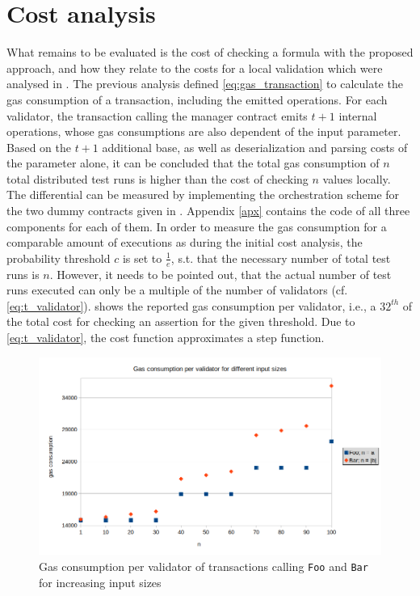 \section{Cost analysis}\label{sec:cost_analysis_distributed}
What remains to be evaluated is the cost of checking a formula with the proposed approach, and how they relate to the costs for a local validation which were analysed in . The previous analysis defined \eqref{eq:gas_transaction} to calculate the gas consumption of a transaction, including the emitted operations. For each validator, the transaction calling the manager contract emits $t+1$ internal operations, whose gas consumptions are also dependent of the input parameter. Based on the $t+1$ additional base, as well as deserialization and parsing costs of the parameter alone, it can be concluded that the total gas consumption of $n$ total distributed test runs is higher than the cost of checking $n$ values locally. \\
The differential can be measured by implementing the orchestration scheme for the two dummy contracts given in . Appendix \ref{apx} contains the code of all three components for each of them. In order to measure the gas consumption for a comparable amount of executions as during the initial cost analysis, the probability threshold $c$ is set to $\frac{1}{e}$, s.t. that the necessary number of total test runs is $n$. However, it needs to be pointed out, that the actual number of test runs executed can only be a multiple of the number of validators (cf. \eqref{eq:t_validator}).  shows the reported gas consumption per validator, i.e., a $32^{th}$ of the total cost for checking an assertion for the given threshold. Due to \eqref{eq:t_validator}, the cost function approximates a step function.
\begin{figure}[t]
\centering
\includegraphics[width=0.9\linewidth]{figures/5-offline_tezos/cost_analysis}
\caption{Gas consumption per validator of transactions calling \texttt{Foo} and \texttt{Bar} for increasing input sizes}
\label{fig:cost_distributed}
\end{figure}
